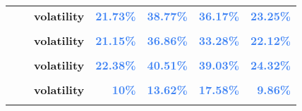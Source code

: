 \documentclass[
  authoryear,
  preprint,
  3p]{elsarticle}
\begin{document}
\begin{longtable}[t]{>{}l>{}l>{}l>{}r>{}r>{}r>{}r}
\addlinespace
\textbf{} & \textbf{} & \textbf{volatility} & \textcolor[HTML]{4285f4}{\textbf{21.73\%}} & \textcolor[HTML]{4285f4}{\textbf{38.77\%}} & \textcolor[HTML]{4285f4}{\textbf{36.17\%}} & \textcolor[HTML]{4285f4}{\textbf{23.25\%}}\\
\textbf{\cellcolor{gray!10}{}} & \textbf{\cellcolor{gray!10}{backwardation}} & \textbf{\cellcolor{gray!10}{mean}} & \textcolor[HTML]{4285f4}{\textbf{\cellcolor{gray!10}{-9.06\%}}} & \textcolor[HTML]{4285f4}{\textbf{\cellcolor{gray!10}{2.95\%}}} & \textcolor[HTML]{4285f4}{\textbf{\cellcolor{gray!10}{10.05\%}}} & \textcolor[HTML]{4285f4}{\textbf{\cellcolor{gray!10}{**29.42\%}}}\\
\textbf{} & \textbf{} & \textbf{volatility} & \textcolor[HTML]{4285f4}{\textbf{21.15\%}} & \textcolor[HTML]{4285f4}{\textbf{36.86\%}} & \textcolor[HTML]{4285f4}{\textbf{33.28\%}} & \textcolor[HTML]{4285f4}{\textbf{22.12\%}}\\
\textbf{\cellcolor{gray!10}{}} & \textbf{\cellcolor{gray!10}{contango}} & \textbf{\cellcolor{gray!10}{mean}} & \textcolor[HTML]{4285f4}{\textbf{\cellcolor{gray!10}{-0.13\%}}} & \textcolor[HTML]{4285f4}{\textbf{\cellcolor{gray!10}{37.11\%}}} & \textcolor[HTML]{4285f4}{\textbf{\cellcolor{gray!10}{5.43\%}}} & \textcolor[HTML]{4285f4}{\textbf{\cellcolor{gray!10}{-11.31\%}}}\\
\textbf{} & \textbf{} & \textbf{volatility} & \textcolor[HTML]{4285f4}{\textbf{22.38\%}} & \textcolor[HTML]{4285f4}{\textbf{40.51\%}} & \textcolor[HTML]{4285f4}{\textbf{39.03\%}} & \textcolor[HTML]{4285f4}{\textbf{24.32\%}}\\
\addlinespace
\textbf{\cellcolor{gray!10}{US commodities}} & \textbf{\cellcolor{gray!10}{whole period}} & \textbf{\cellcolor{gray!10}{mean}} & \textcolor[HTML]{4285f4}{\textbf{\cellcolor{gray!10}{*6.89\%}}} & \textcolor[HTML]{4285f4}{\textbf{\cellcolor{gray!10}{**15.89\%}}} & \textcolor[HTML]{4285f4}{\textbf{\cellcolor{gray!10}{9.39\%}}} & \textcolor[HTML]{4285f4}{\textbf{\cellcolor{gray!10}{-0.18\%}}}\\
\textbf{} & \textbf{} & \textbf{volatility} & \textcolor[HTML]{4285f4}{\textbf{10\%}} & \textcolor[HTML]{4285f4}{\textbf{13.62\%}} & \textcolor[HTML]{4285f4}{\textbf{17.58\%}} & \textcolor[HTML]{4285f4}{\textbf{9.86\%}}\\
\textbf{\cellcolor{gray!10}{}} & \textbf{\cellcolor{gray!10}{backwardation}} & \textbf{\cellcolor{gray!10}{mean}} & \textcolor[HTML]{4285f4}{\textbf{\cellcolor{gray!10}{***15.44\%}}} & \textcolor[HTML]{4285f4}{\textbf{\cellcolor{gray!10}{*15.66\%}}} & \textcolor[HTML]{4285f4}{\textbf{\cellcolor{gray!10}{13.4\%}}} & \textcolor[HTML]{4285f4}{\textbf{\cellcolor{gray!10}{6.82\%}}}\\

\end{longtable}
\end{document}

